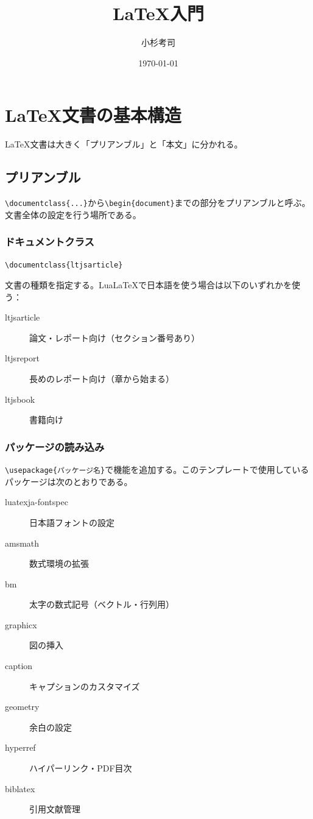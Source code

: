 \documentclass{ltjsarticle}
\title{LaTeX入門}
\author{小杉考司}
\date{\today}
\begin{document}
\maketitle
\tableofcontents %

\newpage

\section{LaTeX文書の基本構造}

LaTeX文書は大きく「プリアンブル」と「本文」に分かれる。

\subsection{プリアンブル}
\verb|\documentclass{...}|から\verb|\begin{document}|までの部分をプリアンブルと呼ぶ。
文書全体の設定を行う場所である。

\subsubsection{ドキュメントクラス}
\begin{verbatim}
\documentclass{ltjsarticle}
\end{verbatim}
文書の種類を指定する。LuaLaTeXで日本語を使う場合は以下のいずれかを使う：
\begin{description}
    \item[ltjsarticle] 論文・レポート向け（セクション番号あり）
    \item[ltjsreport] 長めのレポート向け（章から始まる）
    \item[ltjsbook] 書籍向け
\end{description}

\subsubsection{パッケージの読み込み}
\verb|\usepackage{パッケージ名}|で機能を追加する。このテンプレートで使用しているパッケージは次のとおりである。
\begin{description}
    \item[luatexja-fontspec] 日本語フォントの設定
    \item[amsmath] 数式環境の拡張
    \item[bm] 太字の数式記号（ベクトル・行列用）
    \item[graphicx] 図の挿入
    \item[caption] キャプションのカスタマイズ
    \item[geometry] 余白の設定
    \item[hyperref] ハイパーリンク・PDF目次
    \item[biblatex] 引用文献管理
\end{description}
\end{document}
